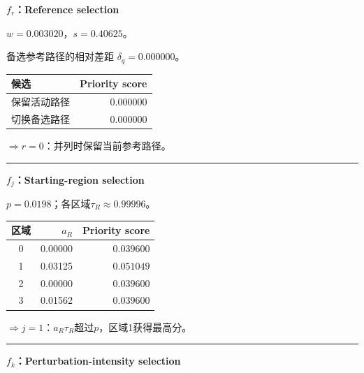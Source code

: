 \small
\noindent\textbf{$f_r$：Reference selection}\par\smallskip
\begin{minipage}[c]{0.42\textwidth}\centering

\end{minipage}\hfill
\begin{minipage}[c]{0.55\textwidth}\small
$w=0.003020$，$s=0.40625$。\par
备选参考路径的相对差距 $\delta_q=0.000000$。\par
\begin{tabular}{@{}lr@{}}\toprule 候选 & Priority score\\\midrule
保留活动路径 & $\mathbf{0.000000}$\\
切换备选路径 & $0.000000$\\
\bottomrule\end{tabular}\par\smallskip
$\Rightarrow r=0$：并列时保留当前参考路径。
\end{minipage}\par\medskip
\noindent\rule{\textwidth}{0.2pt}\par\medskip
\noindent\textbf{$f_j$：Starting-region selection}\par\smallskip
\begin{minipage}[c]{0.42\textwidth}\centering

\end{minipage}\hfill
\begin{minipage}[c]{0.55\textwidth}\small
$p=0.0198$；各区域$\tau_R\approx 0.99996$。\par
\begin{tabular}{@{}crr@{}}\toprule 区域 & $a_R$ & Priority score\\\midrule
0 & 0.00000 & $0.039600$\\
1 & 0.03125 & $\mathbf{0.051049}$\\
2 & 0.00000 & $0.039600$\\
3 & 0.01562 & $0.039600$\\
\bottomrule\end{tabular}\par\smallskip
$\Rightarrow j=1$：$a_R\tau_R$超过$p$，区域1获得最高分。
\end{minipage}\par\medskip
\noindent\rule{\textwidth}{0.2pt}\par\medskip
\noindent\textbf{$f_k$：Perturbation-intensity selection}\par\smallskip
\begin{minipage}[c]{0.42\textwidth}\centering

\end{minipage}\hfill
